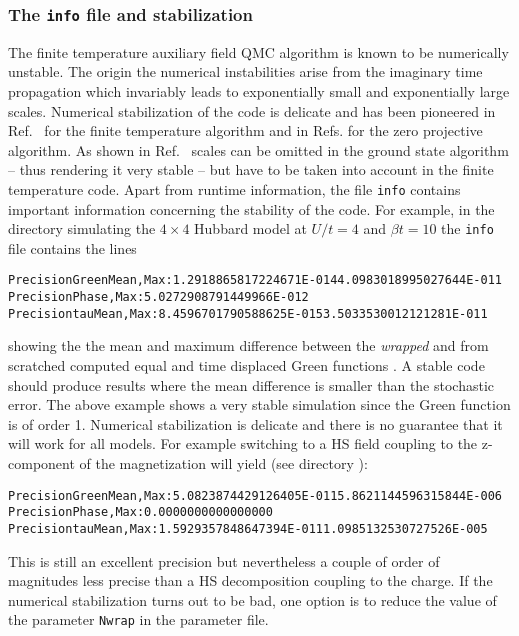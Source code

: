 \subsubsection{The \texttt{info}  file and stabilization}
The finite temperature  auxiliary field QMC algorithm is known to be numerically  unstable. The origin the numerical instabilities arise  from the imaginary time  propagation which invariably leads to exponentially small and exponentially large scales.  Numerical stabilization of the code is delicate and has been pioneered in Ref.~\cite{White89}   for the finite temperature algorithm and in Refs.\cite{Sugiyama86,Sorella89} for the zero  projective algorithm.  As shown in Ref.~\cite{Assaad08_rev}  scales can be omitted in the ground state algorithm -- thus rendering it very stable --  but have to be taken into account in the  finite temperature code.   Apart from runtime information, the file \texttt{info} contains important information concerning the stability of the code. For example, in the directory    simulating the $4 \times 4$ Hubbard model at $U/t=4$ and $\beta t = 10$ the \texttt{info} file contains the lines
\begin{alltt}
Precision Green  Mean, Max :    1.2918865817224671E-014   4.0983018995027644E-011
Precision Phase, Max       :    5.0272908791449966E-012
Precision tau    Mean, Max :    8.4596701790588625E-015   3.5033530012121281E-011
\end{alltt}
showing the  the mean and maximum difference between the {\it  wrapped }  and from scratched  computed equal  and time displaced  Green functions \cite{Assaad08_rev}.  A stable code  should produce results where the mean difference is smaller than the  stochastic error. The above example  shows a very stable  simulation since the Green function  is of order 1. Numerical stabilization is delicate and there is no guarantee  that it will work for all models.   For example switching to a HS   field coupling to the z-component of the magnetization will yield (see directory ):
 \begin{alltt}
Precision Green  Mean, Max :    5.0823874429126405E-011   5.8621144596315844E-006
Precision Phase, Max       :    0.0000000000000000     
Precision tau    Mean, Max :    1.5929357848647394E-011   1.0985132530727526E-005 
\end{alltt}
This is still an excellent precision but nevertheless a couple of order of magnitudes less precise than a HS decomposition coupling to the charge. 
If the numerical stabilization turns out to be bad, one option is to reduce the  value of the parameter \texttt{Nwrap} in the parameter file. 

